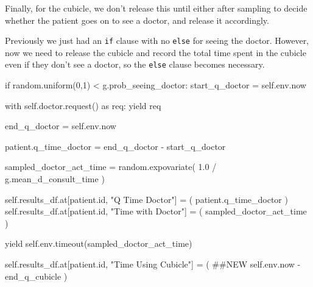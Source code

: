 \documentclass[
  letterpaper,
  DIV=11,
  numbers=noendperiod]{scrreprt}
\newenvironment{Shaded}{\begin{snugshade}}{\end{snugshade}}
\newcommand{\BuiltInTok}[1]{\textcolor[rgb]{0.00,0.23,0.31}{#1}}
\newcommand{\CommentTok}[1]{\textcolor[rgb]{0.37,0.37,0.37}{#1}}
\newcommand{\ControlFlowTok}[1]{\textcolor[rgb]{0.00,0.23,0.31}{#1}}
\newcommand{\DecValTok}[1]{\textcolor[rgb]{0.68,0.00,0.00}{#1}}
\newcommand{\FloatTok}[1]{\textcolor[rgb]{0.68,0.00,0.00}{#1}}
\newcommand{\ImportTok}[1]{\textcolor[rgb]{0.00,0.46,0.62}{#1}}
\newcommand{\NormalTok}[1]{\textcolor[rgb]{0.00,0.23,0.31}{#1}}
\newcommand{\OperatorTok}[1]{\textcolor[rgb]{0.37,0.37,0.37}{#1}}
\newcommand{\StringTok}[1]{\textcolor[rgb]{0.13,0.47,0.30}{#1}}
\newcommand{\VariableTok}[1]{\textcolor[rgb]{0.07,0.07,0.07}{#1}}
\begin{document}
Finally, for the cubicle, we don't release this until either after
sampling to decide whether the patient goes on to see a doctor, and
release it accordingly.

Previously we just had an \texttt{if} clause with no \texttt{else} for
seeing the doctor. However, now we need to release the cubicle and
record the total time spent in the cubicle even if they don't see a
doctor, so the \texttt{else} clause becomes necessary.

\begin{Shaded}
\begin{Highlighting}[]
\ControlFlowTok{if}\NormalTok{ random.uniform(}\DecValTok{0}\NormalTok{,}\DecValTok{1}\NormalTok{) }\OperatorTok{\textless{}}\NormalTok{ g.prob\_seeing\_doctor:}
\NormalTok{    start\_q\_doctor }\OperatorTok{=} \VariableTok{self}\NormalTok{.env.now}

    \ControlFlowTok{with} \VariableTok{self}\NormalTok{.doctor.request() }\ImportTok{as}\NormalTok{ req:}
        \ControlFlowTok{yield}\NormalTok{ req}

\NormalTok{        end\_q\_doctor }\OperatorTok{=} \VariableTok{self}\NormalTok{.env.now}

\NormalTok{        patient.q\_time\_doctor }\OperatorTok{=}\NormalTok{ end\_q\_doctor }\OperatorTok{{-}}\NormalTok{ start\_q\_doctor}

\NormalTok{        sampled\_doctor\_act\_time }\OperatorTok{=}\NormalTok{ random.expovariate(}
            \FloatTok{1.0} \OperatorTok{/}\NormalTok{ g.mean\_d\_consult\_time}
\NormalTok{        )}

        \VariableTok{self}\NormalTok{.results\_df.at[patient.}\BuiltInTok{id}\NormalTok{, }\StringTok{"Q Time Doctor"}\NormalTok{] }\OperatorTok{=}\NormalTok{ (}
\NormalTok{            patient.q\_time\_doctor}
\NormalTok{        )}
        \VariableTok{self}\NormalTok{.results\_df.at[patient.}\BuiltInTok{id}\NormalTok{, }\StringTok{"Time with Doctor"}\NormalTok{] }\OperatorTok{=}\NormalTok{ (}
\NormalTok{            sampled\_doctor\_act\_time}
\NormalTok{        )}

        \ControlFlowTok{yield} \VariableTok{self}\NormalTok{.env.timeout(sampled\_doctor\_act\_time)}

        \VariableTok{self}\NormalTok{.results\_df.at[patient.}\BuiltInTok{id}\NormalTok{, }\StringTok{"Time Using Cubicle"}\NormalTok{] }\OperatorTok{=}\NormalTok{ ( }\CommentTok{\#\#NEW}
            \VariableTok{self}\NormalTok{.env.now }\OperatorTok{{-}}\NormalTok{ end\_q\_cubicle}
\NormalTok{        )}


\end{Highlighting}
\end{Shaded}
\end{document}
